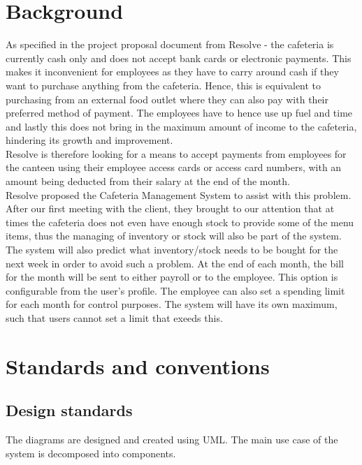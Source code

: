 \documentclass[a4paper,12pt]{report}
\begin{document}
\section{Background}
As specified in the project proposal document from Resolve - the cafeteria is currently cash only and does not accept bank cards or electronic payments. This makes it inconvenient for employees as they have to carry around cash if they want to purchase anything from the cafeteria. Hence, this is equivalent to purchasing from an external food outlet where they can also pay with their preferred method of payment. The employees have to hence use up fuel and time and lastly this does not bring in the maximum amount of income to the cafeteria, hindering its growth and improvement.\\

Resolve is therefore looking for a means to accept payments from employees for the canteen using their employee access cards or access card numbers, with an amount being deducted from their salary at the end of the month.\\

Resolve proposed the Cafeteria Management System to assist with this problem.
After our first meeting with the client, they brought to our attention that at times the cafeteria does not even have enough stock to provide some of the menu items, thus the managing of inventory or stock will also be part of the system. The system will also predict what inventory/stock needs to be bought for the next week in order to avoid such a problem. At the end of each month, the bill for the month will be sent to either payroll or to the employee. This option is configurable from the user's profile. The employee can also set a spending limit for each month for control purposes. The system will have its own maximum, such that users cannot set a limit that exeeds this. 


\section{Standards and conventions}

\subsection{Design standards}
 The diagrams are designed and created using UML. The main use case of the system is decomposed into components.
 
\end{document}
